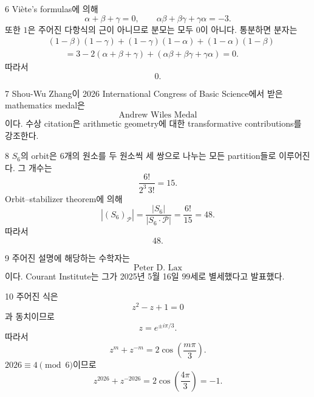 \documentclass[11pt,oneside]{article}
\begin{document}
\begin{problemsolution}{6}
Vi\`ete's formulas에 의해
\[
    \alpha+\beta+\gamma=0,
    \qquad
    \alpha\beta+\beta\gamma+\gamma\alpha=-3.
\]
또한 $1$은 주어진 다항식의 근이 아니므로 분모는 모두 $0$이 아니다. 통분하면 분자는
\[
    \begin{aligned}
        &(1-\beta)(1-\gamma)
        +(1-\gamma)(1-\alpha)
        +(1-\alpha)(1-\beta)\\
        &\qquad
        =3-2(\alpha+\beta+\gamma)
        +(\alpha\beta+\beta\gamma+\gamma\alpha)
        =0.
    \end{aligned}
\]
따라서
\[
    \boxed{0}.
\]
\end{problemsolution}

\newpage

\begin{problemsolution}{7}
Shou-Wu Zhang이 2026 International Congress of Basic Science에서 받은 mathematics medal은
\[
    \boxed{\text{Andrew Wiles Medal}}
\]
이다. 수상 citation은 arithmetic geometry에 대한 transformative contributions를 강조한다.
\end{problemsolution}

\begin{problemsolution}{8}
$S_6$의 orbit은 $6$개의 원소를 두 원소씩 세 쌍으로 나누는 모든 partition들로 이루어진다. 그 개수는
\[
    \frac{6!}{2^3\,3!}=15.
\]
Orbit--stabilizer theorem에 의해
\[
    \left|(S_6)_{\mathcal{P}}\right|
    =
    \frac{|S_6|}{|S_6\cdot\mathcal{P}|}
    =
    \frac{6!}{15}
    =48.
\]
따라서
\[
    \boxed{48}.
\]
\end{problemsolution}

\begin{problemsolution}{9}
주어진 설명에 해당하는 수학자는
\[
    \boxed{\text{Peter D. Lax}}
\]
이다. Courant Institute는 그가 2025년 5월 16일 $99$세로 별세했다고 발표했다.
\end{problemsolution}

\begin{problemsolution}{10}
주어진 식은
\[
    z^2-z+1=0
\]
과 동치이므로
\[
    z=e^{\pm i\pi/3}.
\]
따라서
\[
    z^m+z^{-m}
    =
    2\cos\left(\frac{m\pi}{3}\right).
\]
$2026\equiv4\pmod6$이므로
\[
    \boxed{
        z^{2026}+z^{-2026}
        =
        2\cos\left(\frac{4\pi}{3}\right)
        =-1
    }.
\]
\end{problemsolution}
\end{document}
